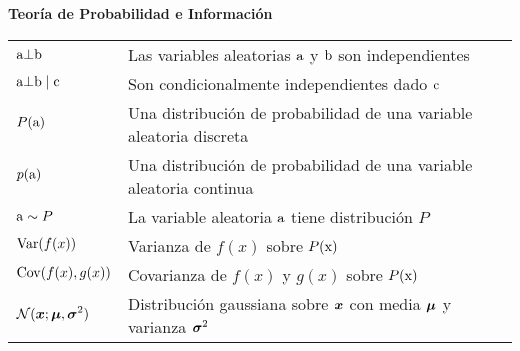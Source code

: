 \vspace{\notationgap}
\begin{minipage}{\textwidth}
\centerline{\bf Teoría de Probabilidad e Información}
\bgroup
\def\arraystretch{1.5}
\begin{tabular}{>{\centering}m{} p{}}
$\displaystyle {\textnormal{a}} \bot {\textnormal{b}}$ & Las variables aleatorias ${\textnormal{a}}$ y ${\textnormal{b}}$ son independientes\\
$\displaystyle {\textnormal{a}} \bot {\textnormal{b}} \mid {\textnormal{c}} $ & Son condicionalmente independientes dado ${\textnormal{c}}$\\
$\displaystyle P({\textnormal{a}})$ & Una distribución de probabilidad de una variable aleatoria discreta\\
$\displaystyle p({\textnormal{a}})$ & Una distribución de probabilidad de una variable aleatoria continua\\
$\displaystyle {\textnormal{a}} \sim P$ & La variable aleatoria ${\textnormal{a}}$ tiene distribución $P$\\%
$\displaystyle \mathrm{Var}(f(x)) $ &  Varianza de $f(x)$ sobre $P({\textnormal{x}})$ \\
$\displaystyle \mathrm{Cov}(f(x),g(x)) $ & Covarianza de $f(x)$ y $g(x)$ sobre $P({\textnormal{x}})$\\
$\displaystyle \mathcal{N} ( {\bm{x}} ; {\bm{\mu}} , {\bm{\sigma}}^2)$ & Distribución gaussiana %
sobre ${\bm{x}}$ con media ${\bm{\mu}}$ y varianza ${\bm{\sigma}}^2$ \\
\end{tabular}
\egroup
{}
\end{minipage}


